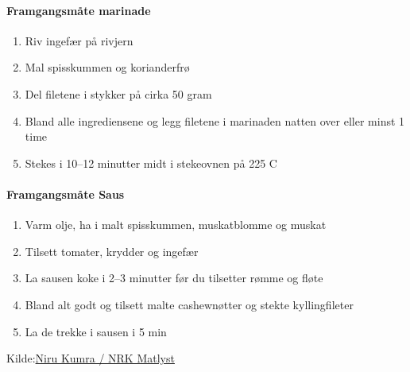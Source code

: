 \paragraph{Framgangsmåte marinade}
\begin{enumerate}[noitemsep]
	\item Riv ingefær på rivjern %
	\item Mal spisskummen og korianderfrø
	\item Del filetene i stykker på cirka 50 gram
	\item Bland alle ingrediensene og legg filetene i marinaden natten over eller minst 1 time
	\item Stekes i 10--12 minutter midt i stekeovnen på 225 \degree C
\end{enumerate}

\paragraph{Framgangsmåte Saus}
\begin{enumerate}[noitemsep]
	\item Varm olje, ha i malt spisskummen, muskatblomme og muskat
	\item Tilsett tomater, krydder og ingefær
	\item La sausen koke i 2--3 minutter før du tilsetter rømme og fløte
	\item Bland alt godt og tilsett malte cashewnøtter og stekte kyllingfileter
	\item La de trekke i sausen i 5 min
\end{enumerate}


Kilde:\href{https://www.nrk.no/mat/nirus-chicken-tikka-masala-1.7314334}{Niru Kumra / NRK Matlyst}
